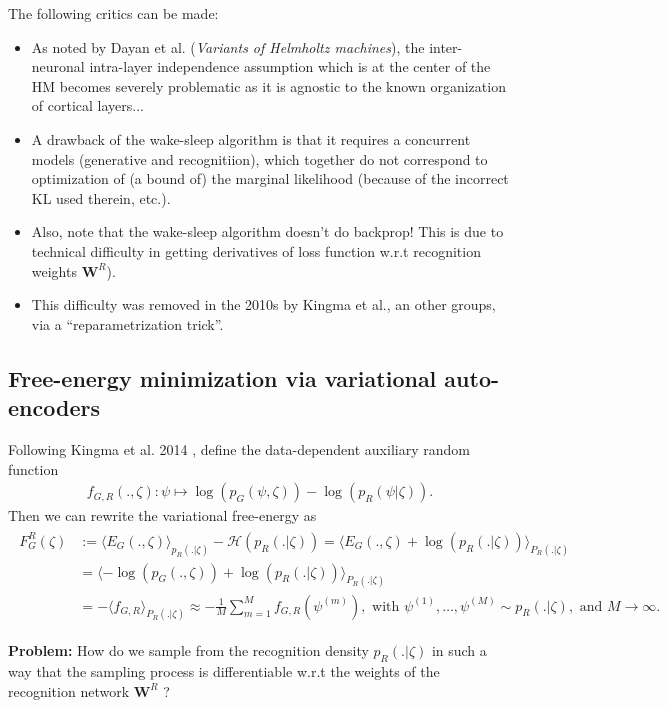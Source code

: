 \documentclass{article} %
\def\W{\mathbf{W}}
\begin{document}
The following critics can be made:
\begin{itemize}
  \item
    As noted by Dayan et al. (\textit{Variants of Helmholtz machines}), the inter-neuronal intra-layer independence assumption which is at the center of the HM becomes severely problematic as it is agnostic to the known organization of cortical layers...
  \item A drawback of the wake-sleep algorithm is that it requires a concurrent models (generative and recognitiion), which together do not correspond to optimization of (a bound of) the marginal likelihood (because of the incorrect KL used therein, etc.).
  \item Also, note that the wake-sleep algorithm doesn't do backprop! This is due to
    technical difficulty in getting derivatives of loss function w.r.t
    recognition weights $\W^R$).
  \item This difficulty was removed in the 2010s by Kingma et al., an other groups, via a ``reparametrization trick''.
    \end{itemize}


\subsection{Free-energy minimization via variational auto-encoders}
Following Kingma et al. 2014 \citep{kingma2013auto}, define the data-dependent auxiliary random function
\begin{eqnarray}
  f_{G,R}(., \zeta) :\psi \mapsto \log(p_G(\psi,\zeta)) - \log(p_R(\psi|\zeta)).
\end{eqnarray}
Then we can rewrite the
variational free-energy as
\begin{eqnarray*}
  \begin{split}
    F_G^R(\zeta) &:= \langle E_G(., \zeta) \rangle_{p_R(. |\zeta)} - \mathcal H(p_R(. |\zeta)) = \langle E_G(., \zeta) + \log(p_R(.|\zeta))\rangle_{P_R(.|\zeta)}\\
    &=\langle -\log(p_G(.,\zeta)) + \log(p_R(.|\zeta))\rangle_{P_R(.|\zeta)}\\
    &= -\langle f_{G,R}\rangle_{P_R(.|\zeta)} \approx -\frac{1}{M}\sum_{m=1}^Mf_{G,R}(\psi^{(m)}), \text{ with }\psi^{(1)},\ldots,\psi^{(M)} \sim p_R(.|\zeta), \text{ and }M \rightarrow \infty.
    \end{split}
\end{eqnarray*}

\begin{mdframed}
  \textbf{Problem:} How do we sample from the recognition density $p_R(.|\zeta)$ in such a way that the sampling process is differentiable w.r.t the weights of the recognition network $\W^R$ ?
\end{mdframed}
\end{document}
